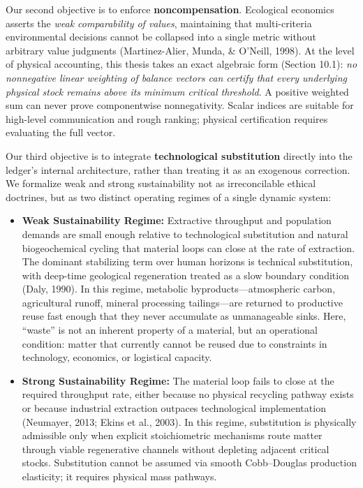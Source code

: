 \documentclass[11pt]{article}
\begin{document}
Our second objective is to enforce \textbf{noncompensation}. Ecological economics asserts the \emph{weak comparability of values}, maintaining that multi-criteria environmental decisions cannot be collapsed into a single metric without arbitrary value judgments (Martinez-Alier, Munda, \& O'Neill, 1998). At the level of physical accounting, this thesis takes an exact algebraic form (Section 10.1): \emph{no nonnegative linear weighting of balance vectors can certify that every underlying physical stock remains above its minimum critical threshold}. A positive weighted sum can never prove componentwise nonnegativity. Scalar indices are suitable for high-level communication and rough ranking; physical certification requires evaluating the full vector.

Our third objective is to integrate \textbf{technological substitution} directly into the ledger's internal architecture, rather than treating it as an exogenous correction. We formalize weak and strong sustainability not as irreconcilable ethical doctrines, but as two distinct operating regimes of a single dynamic system:

\begin{itemize}\setlength{\itemsep}{2pt}
\item \textbf{Weak Sustainability Regime:} Extractive throughput and population demands are small enough relative to technological substitution and natural biogeochemical cycling that material loops can close at the rate of extraction. The dominant stabilizing term over human horizons is technical substitution, with deep-time geological regeneration treated as a slow boundary condition (Daly, 1990). In this regime, metabolic byproducts---atmospheric carbon, agricultural runoff, mineral processing tailings---are returned to productive reuse fast enough that they never accumulate as unmanageable sinks. Here, ``waste'' is not an inherent property of a material, but an operational condition: matter that currently cannot be reused due to constraints in technology, economics, or logistical capacity.
\item \textbf{Strong Sustainability Regime:} The material loop fails to close at the required throughput rate, either because no physical recycling pathway exists or because industrial extraction outpaces technological implementation (Neumayer, 2013; Ekins et al., 2003). In this regime, substitution is physically admissible only when explicit stoichiometric mechanisms route matter through viable regenerative channels without depleting adjacent critical stocks. Substitution cannot be assumed via smooth Cobb--Douglas production elasticity; it requires physical mass pathways.
\end{itemize}
\end{document}
